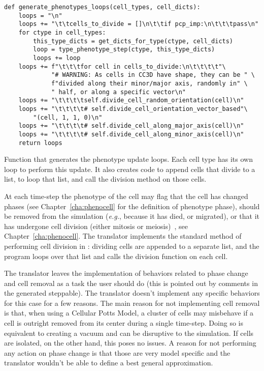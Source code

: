 \begin{listing}[H]%
\begin{verbatim}
def generate_phenotypes_loops(cell_types, cell_dicts):
    loops = "\n"
    loops += "\t\tcells_to_divide = []\n\t\tif pcp_imp:\n\t\t\tpass\n"
    for ctype in cell_types:
        this_type_dicts = get_dicts_for_type(ctype, cell_dicts)
        loop = type_phenotype_step(ctype, this_type_dicts)
        loops += loop
    loops += f"\t\t\tfor cell in cells_to_divide:\n\t\t\t\t"\
             "# WARNING: As cells in CC3D have shape, they can be " \
             f"divided along their minor/major axis, randomly in" \
             " half, or along a specific vector\n"
    loops += "\t\t\t\tself.divide_cell_random_orientation(cell)\n"
    loops += "\t\t\t\t# self.divide_cell_orientation_vector_based"\
        "(cell, 1, 1, 0)\n"
    loops += "\t\t\t\t# self.divide_cell_along_major_axis(cell)\n"
    loops += "\t\t\t\t# self.divide_cell_along_minor_axis(cell)\n"
    return loops
\end{verbatim}
\caption{Function that generates the phenotype update loops. Each cell type has its own loop to perform this update. It also creates code to append cells that divide to a list, to loop that list, and call the division method on those cells.}\label{code:trans:cc3d:pheno-step:gen:loop}
\end{listing}

At each time-step the phenotype of the cell may flag that the cell has changed phases (see Chapter~\ref{cha:phenocell} for the definition of phenotype phase), should be removed from the simulation (\textit{e.g.}, because it has died, or migrated), or that it has undergone cell division (either mitosis or meiosis)~\cite{gianlupi_phenocellpy_2023}, see Chapter~\ref{cha:phenocell}. The translator implements the standard method of performing cell division in \ccd: dividing cells are appended to a separate list, and the program loops over that list and calls the division function on each cell.

The translator leaves the implementation of behaviors related to phase change and cell removal as a task the user should do (this is pointed out by comments in the generated  steppable). The translator doesn't
implement any specific behaviors for this case for a few reasons. The main reason for not implementing cell removal is that, when using a Cellular Potts Model, a cluster of cells may misbehave if a cell is outright removed from its center during a single time-step. Doing so is equivalent to creating a vacuum and can be disruptive to the simulation. If cells are isolated, on the other hand, this poses no issues. A reason for not performing any action on phase change is that those are very model specific and the translator wouldn't be able to define a best general approximation.

